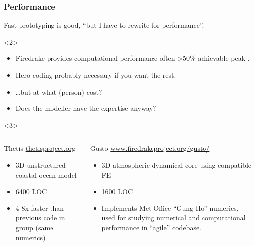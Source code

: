 \documentclass[presentation]{beamer}
\begin{document}
\begin{frame}
  \frametitle{Performance}
  Fast prototyping is good, ``but I have to rewrite for performance''.

  \begin{overlayarea}{\textwidth}{0.8\textheight}
    \begin{onlyenv}<2>
      \begin{itemize}
      \item Firedrake provides computational performance often >50\%
        achievable peak
        \parencite{Luporini:2015,Bercea:2016,Mitchell:2016}.
      \item Hero-coding probably necessary if you want the rest.
      \item \ldots but at what (person) cost?
      \item Does the modeller have the expertise anyway?
      \end{itemize}
    \end{onlyenv}
    \begin{onlyenv}<3>
      \begin{columns}[t]
        \begin{column}{0.5\textwidth}
          \begin{block}{Thetis}
            {\scriptsize \url{thetisproject.org}}
            \begin{itemize}
            \item 3D unstructured coastal ocean model
            \item 6400 LOC
            \item 4-8x faster than previous code in group (same numerics)
            \end{itemize}
          \end{block}
        \end{column}
        \begin{column}{0.5\textwidth}
          \begin{block}{Gusto}
            {\scriptsize \url{www.firedrakeproject.org/gusto/}}
            \begin{itemize}
            \item 3D atmospheric dynamical core using compatible FE
            \item 1600 LOC
            \item Implements Met Office ``Gung Ho'' numerics, used for
              studying numerical and computational performance in
              ``agile'' codebase.
            \end{itemize}
          \end{block}
        \end{column}
      \end{columns}
    \end{onlyenv}
  \end{overlayarea}
\end{frame}
\end{document}
